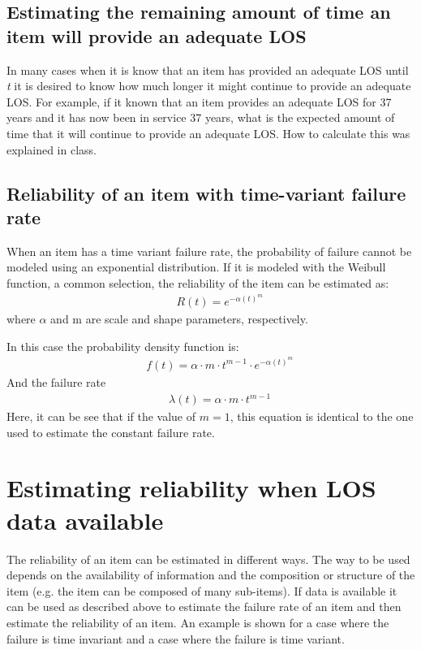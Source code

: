 \subsection{Estimating the remaining amount of time an item will provide an
adequate LOS}
In many cases when it is know that an item has provided an adequate LOS until
\textit{t} it is desired to know how much longer it might continue to provide an
adequate LOS. For example, if it known that an item provides an adequate LOS for
37 years and it has now been in service 37 years, what is the expected amount of
time that it will continue to provide an adequate LOS. How to calculate this was
explained in class.
\subsection{Reliability of an item with time-variant failure rate} \label{reliaweibl}
When an item has a time variant failure rate, the probability of failure cannot
be modeled using an exponential distribution. If it is modeled with the Weibull
function, a common selection, the reliability of the item can be estimated as:
\begin{eqnarray}
&& R(t) = {e^{ - \alpha{{( t)}^m}}}
\label{eqreliability:10}
\end{eqnarray}
where $\alpha $ and m are scale and shape parameters, respectively.

In this case the probability density function is:
\begin{eqnarray}
&& f(t) = \alpha  \cdot m \cdot {t^{m - 1}} \cdot {e^{ - \alpha{{(t)}^m}}}
\label{eqreliability:11}
\end{eqnarray}
And the failure rate
\begin{eqnarray}
&& \lambda (t) = \alpha  \cdot m \cdot {t^{m - 1}}
\label{eqreliability:12}
\end{eqnarray}
Here, it can be see that if the value of $m=1$, this equation is identical to the
one used to estimate the constant failure rate.
\section{Estimating reliability when LOS data available}
The reliability of an item can be estimated in different ways. The way to be
used depends on the availability of information and the composition or structure
of the item (e.g. the item can be composed of many sub-items). If data is
available it can be used as described above to estimate the failure rate of an
item and then estimate the reliability of an item. An example is shown for a case
where the failure is time invariant and a case where the failure is time variant.

